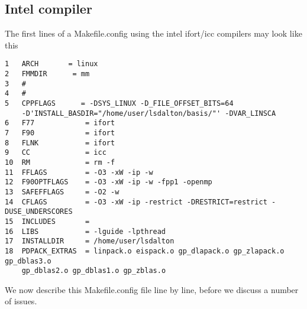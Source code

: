 \subsection{Intel compiler}\label{ifortMakefile}
The first lines of a Makefile.config using the intel ifort/icc compilers may look like this
\begin{verbatim}
1   ARCH       = linux
2   FMMDIR      = mm
3   #
4   #
5   CPPFLAGS      = -DSYS_LINUX -D_FILE_OFFSET_BITS=64
    -D'INSTALL_BASDIR="/home/user/lsdalton/basis/"' -DVAR_LINSCA
6   F77            = ifort
7   F90            = ifort
8   FLNK           = ifort
9   CC             = icc
10  RM             = rm -f
11  FFLAGS         = -O3 -xW -ip -w
12  F90OPTFLAGS    = -O3 -xW -ip -w -fpp1 -openmp
13  SAFEFFLAGS     = -O2 -w
14  CFLAGS         = -O3 -xW -ip -restrict -DRESTRICT=restrict -DUSE_UNDERSCORES
15  INCLUDES       = 
16  LIBS           = -lguide -lpthread 
17  INSTALLDIR     = /home/user/lsdalton
18  PDPACK_EXTRAS  = linpack.o eispack.o gp_dlapack.o gp_zlapack.o gp_dblas3.o 
    gp_dblas2.o gp_dblas1.o gp_zblas.o
\end{verbatim}
We now describe this Makefile.config file line by line, before we discuss a number of issues.

